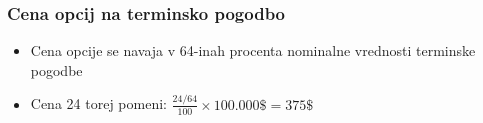 \documentclass[14pt]{beamer}
\begin{document}
\begin{frame}
    \frametitle{Cena opcij na terminsko pogodbo}
    \begin{itemize}
        \item Cena opcije se navaja v 64-inah procenta nominalne vrednosti terminske pogodbe
        \item Cena 24 torej pomeni: $\frac{24/64}{100}\times 100.000\$ = 375\$$
    \end{itemize}
\end{frame}
\end{document}
